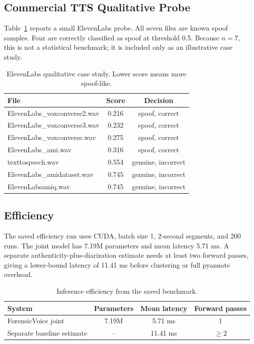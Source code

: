 \documentclass{article}
\newcommand{\fv}{ForensicVoice}
\begin{document}
\subsection{Commercial TTS Qualitative Probe}

Table~\ref{tab:elevenlabs} reports a small ElevenLabs probe.  All seven files
are known spoof samples.  Four are correctly classified as spoof at threshold
0.5.  Because $n=7$, this is not a statistical benchmark; it is included only
as an illustrative case study.

\begin{table}[t]
  \centering
  \caption{ElevenLabs qualitative case study.  Lower score means more spoof-like.}
  \label{tab:elevenlabs}
  \small
  \begin{tabular}{lcc}
    \toprule
    File & Score & Decision \\
    \midrule
    ElevenLabs\_voxconverse2.wav & 0.216 & spoof, correct \\
    ElevenLabs\_voxconverse3.wav & 0.232 & spoof, correct \\
    ElevenLabs\_voxconverse.wav & 0.275 & spoof, correct \\
    ElevenLabs\_ami.wav & 0.316 & spoof, correct \\
    texttospeech.wav & 0.554 & genuine, incorrect \\
    ElevenLabs\_amidataset.wav & 0.745 & genuine, incorrect \\
    ElevenLabsamiq.wav & 0.745 & genuine, incorrect \\
    \bottomrule
  \end{tabular}
\end{table}

\subsection{Efficiency}

The saved efficiency run uses CUDA, batch size 1, 2-second segments, and 200
runs.  The joint model has 7.19M parameters and mean latency 5.71 ms.  A
separate authenticity-plus-diarization estimate needs at least two forward
passes, giving a lower-bound latency of 11.41 ms before clustering or full
pyannote overhead.

\begin{table}[t]
  \centering
  \caption{Inference efficiency from the saved benchmark.}
  \label{tab:efficiency}
  \small
  \begin{tabular}{lccc}
    \toprule
    System & Parameters & Mean latency & Forward passes \\
    \midrule
    \fv{} joint & 7.19M & 5.71 ms & 1 \\
    Separate baseline estimate & -- & 11.41 ms & $\geq 2$ \\
    \bottomrule
  \end{tabular}
\end{table}
\end{document}
